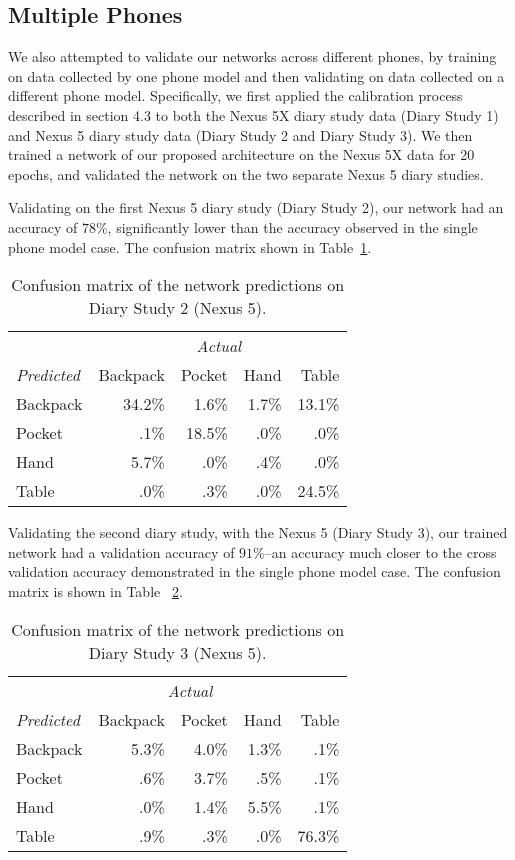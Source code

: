 \subsection{Multiple Phones}
We also attempted to validate our networks across different phones, by training
on data collected by one phone model and then validating on data collected on a 
different phone model. Specifically, we first applied the calibration process described in section 4.3 
to both the Nexus 5X diary study data (Diary Study 1) and Nexus 5 diary study data (Diary Study 2 and Diary Study 3).
We then trained a network of our proposed architecture on the Nexus 5X data for 20 epochs, 
and validated the network on the two separate Nexus 5 diary studies.

Validating on the first Nexus 5 diary study (Diary Study 2), our network
had an accuracy of $78\%$, significantly lower than the accuracy observed
in the single phone model case. The  confusion matrix shown in Table~\ref{fig:confusion2}.

\begin{table}[h]
\caption{Confusion matrix of the network predictions on Diary Study 2 (Nexus 5).}\label{fig:confusion2}
\centering
\begin{tabular}{ l rrrr }  
\toprule
   & \multicolumn{4}{c}{\textit{Actual}} \\
\cmidrule{2-5}
\textit{Predicted}	&	Backpack    & 	Pocket 	& 	Hand	&	Table \\
\midrule
Backpack			&	34.2\% 	&	1.6\%	&	1.7\% 	&	13.1\% \\
Pocket			&	.1\% 		&	18.5\% 	&	.0\%		&	.0\% \\
Hand			&	5.7\%	&	.0\%	 	&	.4\% 		&	.0\% \\
Table			&	.0\% 		&	.3\% 		&	.0\%	 	&	24.5\%\\
\bottomrule
\end{tabular}
\end{table}

Validating the second diary study, with the Nexus 5 (Diary Study 3), our trained network had a validation
accuracy of $91\%$--an accuracy much closer to the cross validation accuracy
demonstrated in the single phone model case. The  confusion matrix is 
shown in Table ~\ref{fig:confusion3}.

\begin{table}[h]
\caption{Confusion matrix of the network predictions on Diary Study 3 (Nexus 5).}\label{fig:confusion3} \centering
\begin{tabular}{ l rrrr }  
\toprule
 & \multicolumn{3}{c}{\textit{Actual}} \\ 
\cmidrule{2-5}
\textit{Predicted}	&	Backpack    & 	Pocket 	& 	Hand	&	Table \\
\midrule
Backpack			&	5.3\% 	&	4.0\%	&	1.3\% 	&	.1\% \\
Pocket			&	  .6\% 	&	3.7\% 	&	.5\% 		&	.1\% \\
Hand			&	 .0\% 	&	1.4\% 	&	5.5\% 	&	.1\% \\
Table			&	 .9\% 	&	 .3\% 	&	.0\%		&	76.3\%\\
\bottomrule
\end{tabular}
\end{table}



